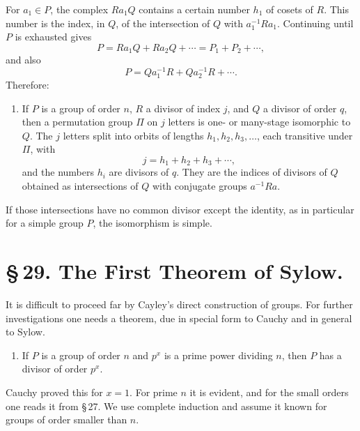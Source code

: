 \documentclass[11pt]{article}
\begin{document}
For $a_1\in P$, the complex $Ra_1Q$ contains a certain number $h_1$ of cosets of $R$. This number is the index, in $Q$, of the intersection of $Q$ with $a_1^{-1}Ra_1$. Continuing until $P$ is exhausted gives
\begin{equation}
P=Ra_1Q+Ra_2Q+\cdots=P_1+P_2+
\cdots,
\tag{9}
\end{equation}
and also
\begin{equation}
P=Qa_1^{-1}R+Qa_2^{-1}R+
\cdots .
\tag{10}
\end{equation}
Therefore:
\begin{enumerate}[label=\arabic*.,leftmargin=2.2em,start=3]
\item If $P$ is a group of order $n$, $R$ a divisor of index $j$, and $Q$ a divisor of order $q$, then a permutation group $\Pi$ on $j$ letters is one- or many-stage isomorphic to $Q$. The $j$ letters split into orbits of lengths $h_1,h_2,h_3,
\ldots$, each transitive under $\Pi$, with
\[
j=h_1+h_2+h_3+\cdots,
\tag{11}
\]
and the numbers $h_i$ are divisors of $q$. They are the indices of divisors of $Q$ obtained as intersections of $Q$ with conjugate groups $a^{-1}Ra$.
\end{enumerate}
If those intersections have no common divisor except the identity, as in particular for a simple group $P$, the isomorphism is simple.

\section*{\S\,29. The First Theorem of Sylow.}

It is difficult to proceed far by Cayley's direct construction of groups. For further investigations one needs a theorem, due in special form to Cauchy and in general to Sylow.
\begin{enumerate}[label=\Roman*.,leftmargin=2.4em]
\item If $P$ is a group of order $n$ and $p^x$ is a prime power dividing $n$, then $P$ has a divisor of order $p^x$.
\end{enumerate}

Cauchy proved this for $x=1$. For prime $n$ it is evident, and for the small orders one reads it from \S\,27. We use complete induction and assume it known for groups of order smaller than $n$.
\end{document}
